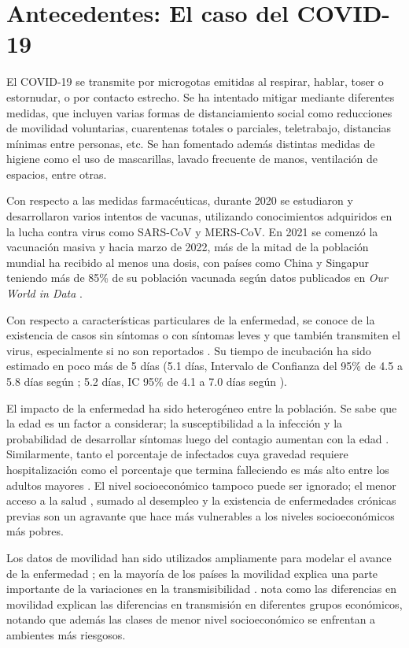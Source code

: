 \section{Antecedentes: El caso del COVID-19} \label{sec:antecedentes}

El COVID-19 se transmite por microgotas emitidas al respirar, hablar, toser o estornudar, o por contacto estrecho. Se ha intentado mitigar mediante diferentes medidas, que incluyen varias formas de distanciamiento social como reducciones de movilidad voluntarias, cuarentenas totales o parciales, teletrabajo, distancias mínimas entre personas, etc. Se han fomentado además distintas medidas de higiene como el uso de mascarillas, lavado frecuente de manos, ventilación de espacios, entre otras.

Con respecto a las medidas farmacéuticas, durante 2020 se estudiaron y desarrollaron varios intentos de vacunas, utilizando conocimientos adquiridos en la lucha contra virus como SARS-CoV y MERS-CoV. En 2021 se comenzó la vacunación masiva y hacia marzo de 2022, más de la mitad de la población mundial ha recibido al menos una dosis, con países como China y Singapur teniendo más de 85\% de su población vacunada según datos publicados en \textit{Our World in Data} \cite{Mathieu2021}.

Con respecto a características particulares de la enfermedad, se conoce de la existencia de casos sin síntomas o con síntomas leves y que también transmiten el virus, especialmente si no son reportados \cite{Li2020c}\cite{Byambasuren2020}\cite{Gao2021}. Su tiempo de incubación ha sido estimado en poco más de 5 días (5.1 días, Intervalo de Confianza del 95\% de 4.5 a 5.8 días según \cite{Lauer2020}; 5.2 días, IC 95\% de 4.1 a 7.0 días según \cite{Li2020d}). 

El impacto de la enfermedad ha sido heterogéneo entre la población. Se sabe que la edad es un factor a considerar; la susceptibilidad a la infección y la probabilidad de desarrollar síntomas luego del contagio aumentan con la edad \cite{Davies2020}. Similarmente, tanto el porcentaje de infectados cuya gravedad requiere hospitalización como el porcentaje que termina falleciendo es más alto entre los adultos mayores \cite{Verity2020}. El nivel socioeconómico tampoco puede ser ignorado; el menor acceso a la salud \cite{Wang2020}, sumado al desempleo y la existencia de enfermedades crónicas previas \cite{Ahmed2020} son un agravante que hace más vulnerables a los niveles socioeconómicos más pobres.

Los datos de movilidad han sido utilizados ampliamente para modelar el avance de la enfermedad \cite{Lai2020}\cite{Kraemer2020}\cite{Chinazzi2020}; en la mayoría de los países la movilidad explica una parte importante de la variaciones en la transmisibilidad \cite{Nouvellet2021}. \cite{Chang2021} nota como las diferencias en movilidad explican las diferencias en transmisión en diferentes grupos económicos, notando que además las clases de menor nivel socioeconómico se enfrentan a ambientes más riesgosos.

